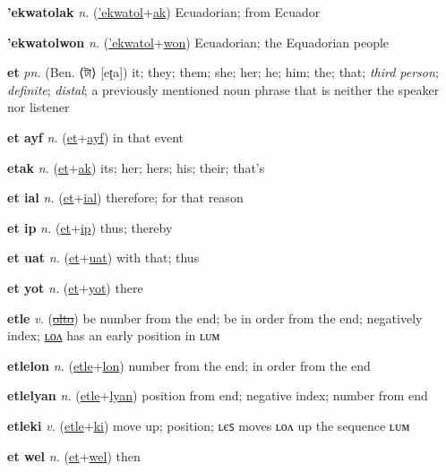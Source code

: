 \textbf{\hypertarget{'ekwatolak}{'ekwatolak}} \textit{n.} (\hyperlink{'ekwatol}{'ekwatol}+\allowbreak \hyperlink{ak}{ak})
Ecuadorian; from Ecuador

\textbf{\hypertarget{'ekwatolwon}{'ekwatolwon}} \textit{n.} (\hyperlink{'ekwatol}{'ekwatol}+\allowbreak \hyperlink{won}{won})
Ecuadorian; the Equadorian people

\textbf{\hypertarget{et}{et}} \textit{pn.} (Ben. ⟨{\bengali{}টা}⟩ [eʈa])
it; they; them; she; her; he; him; the; that; \textit{third person}; \textit{definite}; \textit{distal}; a previously mentioned noun phrase that is neither the speaker nor listener

\textbf{\hypertarget{et ayf}{et ayf}} \textit{n.} (\hyperlink{et}{et}+\allowbreak \hyperlink{ayf}{ayf})
in that event

\textbf{\hypertarget{etak}{etak}} \textit{n.} (\hyperlink{et}{et}+\allowbreak \hyperlink{ak}{ak})
its; her; hers; his; their; that’s

\textbf{\hypertarget{et ial}{et ial}} \textit{n.} (\hyperlink{et}{et}+\allowbreak \hyperlink{ial}{ial})
therefore; for that reason

\textbf{\hypertarget{et ip}{et ip}} \textit{n.} (\hyperlink{et}{et}+\allowbreak \hyperlink{ip}{ip})
thus; thereby

\textbf{\hypertarget{et uat}{et uat}} \textit{n.} (\hyperlink{et}{et}+\allowbreak \hyperlink{uat}{uat})
with that; thus

\textbf{\hypertarget{et yot}{et yot}} \textit{n.} (\hyperlink{et}{et}+\allowbreak \hyperlink{yot}{yot})
there

\textbf{\hypertarget{etle}{etle}} \textit{v.} (\hyperlink{olto}{\sout{olto}})
be number from the end; be in order from the end; negatively index; \hyperlink{etlelon}{ʟᴏᴧ} has an early position in ʟᴜᴍ

\textbf{\hypertarget{etlelon}{etlelon}} \textit{n.} (\hyperlink{etle}{etle}+\allowbreak \hyperlink{lon}{lon})
number from the end; in order from the end

\textbf{\hypertarget{etlelyan}{etlelyan}} \textit{n.} (\hyperlink{etle}{etle}+\allowbreak \hyperlink{lyan}{lyan})
position from end; negative index; number from end

\textbf{\hypertarget{etleki}{etleki}} \textit{v.} (\hyperlink{etle}{etle}+\allowbreak \hyperlink{ki}{ki})
move up; position; ʟєꜱ moves ʟᴏᴧ up the sequence ʟᴜᴍ

\textbf{\hypertarget{et wel}{et wel}} \textit{n.} (\hyperlink{et}{et}+\allowbreak \hyperlink{wel}{wel})
then

